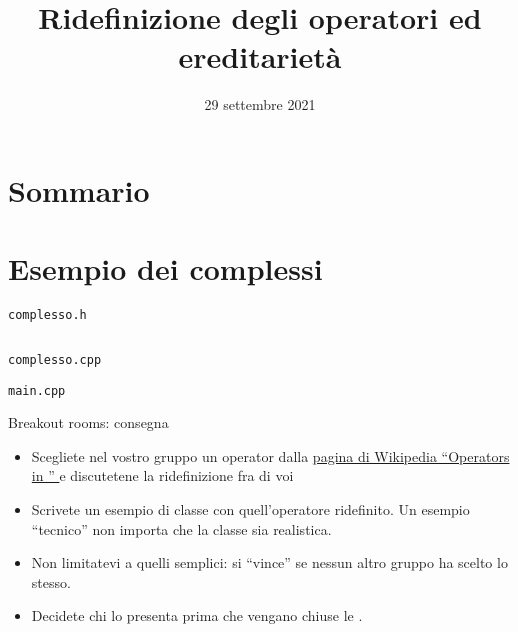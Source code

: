 \documentclass[xcolor={dvipsnames, svgnames, x11names, table}, 10pt]{beamer}
\title{Ridefinizione degli operatori ed ereditarietà}
\date{29 settembre 2021}
\begin{document}
\frame{\titlepage}

\section*{Sommario}
\begin{frame}
    \tableofcontents[pausesections]
\end{frame}

\section{Esempio dei complessi}

\begin{frame}[fragile]{\texttt{complesso.h}}

\begin{columns}
    \column{\dimexpr\paperwidth-30pt}
\end{columns}
\vspace*{\fill}

\end{frame}

\begin{frame}[fragile]{\texttt{complesso.cpp}}


\end{frame}

\begin{frame}[fragile]{\texttt{main.cpp}}


\end{frame}

\begin{frame}{Breakout rooms: consegna}
    \begin{itemize}
        \item Scegliete nel vostro gruppo un operator dalla \href{https://en.wikipedia.org/wiki/Operators\_in\_C\_and\_C\%2B\%2B}{pagina di Wikipedia \enquote{Operators in \cplusplus} \ExternalLink} e discutetene la ridefinizione fra di voi
        \item Scrivete un esempio di classe con quell'operatore ridefinito. Un esempio \enquote{tecnico} non importa che la classe sia realistica.
        \item Non limitatevi a quelli semplici: si \enquote{vince} se nessun altro gruppo ha scelto lo stesso.
        \item Decidete chi lo presenta prima che vengano chiuse le .
    \end{itemize}
\end{frame}
\end{document}
